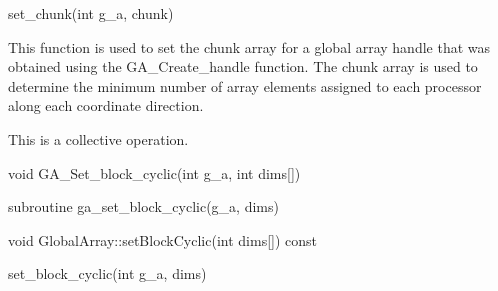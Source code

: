 \documentclass[12pt]{article}
\begin{document}
\begin{pyapi}
\begin{pycode}
set_chunk(int g_a, chunk)
\end{pycode}
\end{pyapi}

\begin{desc}

  This function is used to set the chunk array for a global array
  handle that was obtained using the GA_Create_handle function. The
  chunk array is used to determine the minimum number of array
  elements assigned to each processor along each coordinate direction.

  This is a collective operation.

\end{desc}


\begin{capi}
\begin{ccode}
void GA_Set_block_cyclic(int g_a, int dims[])
\end{ccode}
\begin{funcargs}
\end{funcargs}
\end{capi}

\begin{fapi}
\begin{fcode}
subroutine ga_set_block_cyclic(g_a, dims)
\end{fcode}
\begin{funcargs}
\end{funcargs}
\end{fapi}

\begin{cxxapi}
\begin{cxxcode}
void GlobalArray::setBlockCyclic(int dims[]) const
\end{cxxcode}
\begin{funcargs}
\end{funcargs}
\end{cxxapi}

\begin{pyapi}
\begin{pycode}
set_block_cyclic(int g_a, dims)
\end{pycode}
\end{pyapi}
\end{document}
